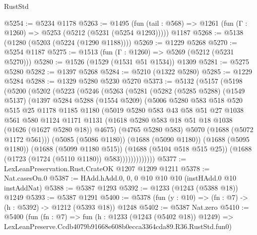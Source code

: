 \begin{lexlean}{RustStd}
\begin{coremodule}
@5254 := @5234 @1178
@5263 := @1495
    (fun (tail : @568) => @1261 (fun (Γ : @1260) => @5253 (@5212 (@5231 (@5254 @1293)))))
    @1187
@5268 := @5138 (@1280 (@5203 (@5224 (@1290 @1188))))
@5269 := @1229 @5268
@5270 := @5254 @1187
@5275 := @1513 (fun (Γ : @1260) => @5269 (@5212 (@5231 @5270)))
@5280 := @1526 (@1529 (@1531 @51 @1534)) @1309
@5281 := @5275 @5280
@5282 := @1397 @5268
@5284 := @5210 (@1322 @5280)
@5285 := @1229 @5284
@5288 := @1329 @5280 @5230 @5270
@5373 := @5132
    (@5157
      (@5198
        (@5200
          (@5202
            (@5223
              (@5246
                (@5263
                  (@5281
                    (@5282
                      (@5285 @5288)
                      (@1549 @5137)
                      (@1397
                        @5284
                        @5288
                        (@1554 @5209)
                        (@5006
                          @5280
                          @583
                          @518
                          @520
                          @515
                          @25
                          @1178
                          @1185
                          @1180
                          (@5019
                            @5280
                            @583
                            @43
                            @58
                            @51
                            @27
                            @1038
                            @561
                            @580
                            @1124
                            @1171
                            @1131
                            (@1618 @5280 @583 @18 @51 @18 @1038 (@1626 (@1627 @5280 @18)) @4675)
                            (@4765 @5280 @583)
                            @5070
                            (@1688 (@5072 @1172 @561)))
                          (@5085 (@5086 @1180))
                          (@1688 (@5090 @1180))
                          (@1688 (@5095 @1180))
                          (@1688 (@5099 @1180 @515))
                          (@1688 (@5104 @518 @515 @25))
                          (@1688 (@1723 (@1724 (@5110 @1180)) @583)))))))))))))
@5377 := LexLeanPreservation.Rust.CrateOK @1207 @1209 @1211
@5378 := Nat.casesOn.{0}
@5387 := HAdd.hAdd.{0, 0, 0} @10 @10 @10 (instHAdd.{0} @10 instAddNat)
@5388 := @5387 @1293
@5392 := @1233 (@1243 (@5388 @18)) @1249
@5393 := @5387 @1291
@5400 := @5378 (fun (y : @10) => (fn : @7) -> (h : @5392) -> @1212 (@5393 @18)) @1248
@5402 := @5387 Nat.zero
@5410 := @5400
    (fun (fn : @7) =>
    fun (h : @1233 (@1243 (@5402 @18)) @1249) =>
    LexLeanPreserve.Ccdb4079b91668e608b0ecca3364cda89.R36.RustStd.fun0)

\end{coremodule}
\end{lexlean}
